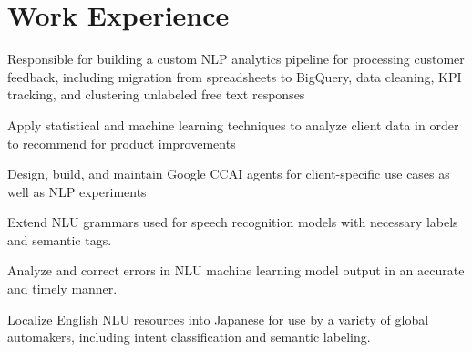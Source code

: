 \documentclass[letterpaper]{deedy-resume_sm} %
\begin{document}

\lastupdated %


\section{Work Experience}
\begin{tightitemize}
\item Responsible for building a custom NLP analytics pipeline for processing customer feedback, including migration from spreadsheets to BigQuery, data cleaning, KPI tracking, and clustering unlabeled free text responses
\item Apply statistical and machine learning techniques to analyze client data in order to recommend for product improvements
\item Design, build, and maintain Google CCAI agents for client-specific use cases as well as NLP experiments
\end{tightitemize}
\begin{tightitemize}
\item Extend NLU grammars used for speech recognition models with necessary labels and semantic tags.
\item Analyze and correct errors in NLU machine learning model output in an accurate and timely manner.
\item Localize English NLU resources into Japanese for use by a variety of global automakers, including intent classification and semantic labeling.   
\end{tightitemize}
\end{document}
